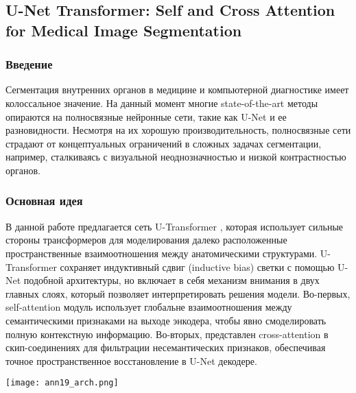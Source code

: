 \subsection*{U-Net Transformer: Self and Cross Attention for
Medical Image Segmentation}

\subsubsection*{Введение}
Сегментация внутренних органов в медицине и компьютерной диагностике имеет 
колоссальное значение. На данный момент многие state-of-the-art методы 
опираются на полносвязные нейронные сети, такие как U-Net \cite{Unet} и ее разновидности. 
Несмотря на их хорошую производительность, полносвязные сети страдают от концептуальных 
ограничений в сложных задачах сегментации, например, сталкиваясь с визуальной 
неоднозначностью и низкой контрастностью органов.
\subsubsection*{Основная идея}
В данной работе \cite{ann19} предлагается сеть U-Transformer \cite{Unet}, которая использует 
сильные стороны трансформеров для моделирования далеко расположенные 
пространственные взаимоотношения между анатомическими структурами. U-Transformer 
сохраняет индуктивный сдвиг (inductive bias) светки с помощью U-Net подобной архитектуры, 
но включает в себя механизм внимания в двух главных слоях, который позволяет интерпретировать 
решения модели. Во-первых, self-attention модуль использует глобальне взаимоотношения между 
семантическими признаками на выходе энкодера, чтобы явно смоделировать полную контекстную информацию.
Во-вторых, представлен cross-attention в  скип-соединениях для фильтрации несемантических 
признаков, обеспечивая точное пространственное восстановление в U-Net декодере.
\\
\begin{minipage}{1.0\linewidth}
    \begin{center}
        \texttt{[image: ann19\_arch.png]} \\
    \end{center}
    
\end{minipage} 
